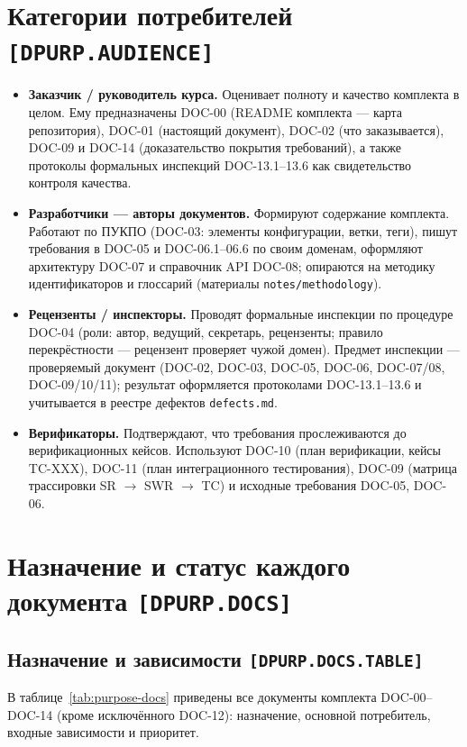 \documentclass[12pt,a4paper]{article}
\begin{document}
\section{Категории потребителей \texttt{[DPURP.AUDIENCE]}}
\begin{itemize}
  \item \textbf{Заказчик / руководитель курса.} Оценивает полноту и качество комплекта
        в целом. Ему предназначены DOC-00 (README комплекта — карта репозитория),
        DOC-01 (настоящий документ), DOC-02 (что заказывается), DOC-09 и DOC-14
        (доказательство покрытия требований), а также протоколы формальных инспекций
        DOC-13.1--13.6 как свидетельство контроля качества.
  \item \textbf{Разработчики — авторы документов.} Формируют содержание комплекта.
        Работают по ПУКПО (DOC-03: элементы конфигурации, ветки, теги), пишут
        требования в DOC-05 и DOC-06.1--06.6 по своим доменам, оформляют архитектуру
        DOC-07 и справочник API DOC-08; опираются на методику идентификаторов и
        глоссарий (материалы \texttt{notes/methodology}).
  \item \textbf{Рецензенты / инспекторы.} Проводят формальные инспекции по процедуре
        DOC-04 (роли: автор, ведущий, секретарь, рецензенты; правило перекрёстности —
        рецензент проверяет чужой домен). Предмет инспекции — проверяемый документ
        (DOC-02, DOC-03, DOC-05, DOC-06, DOC-07/08, DOC-09/10/11); результат
        оформляется протоколами DOC-13.1--13.6 и учитывается в реестре дефектов
        \texttt{defects.md}.
  \item \textbf{Верификаторы.} Подтверждают, что требования прослеживаются до
        верификационных кейсов. Используют DOC-10 (план верификации, кейсы TC-XXX),
        DOC-11 (план интеграционного тестирования), DOC-09 (матрица трассировки
        SR $\rightarrow$ SWR $\rightarrow$ TC) и исходные требования DOC-05, DOC-06.
\end{itemize}

\section{Назначение и статус каждого документа \texttt{[DPURP.DOCS]}}

\subsection{Назначение и зависимости \texttt{[DPURP.DOCS.TABLE]}}
В таблице~\ref{tab:purpose-docs} приведены все документы комплекта DOC-00--DOC-14
(кроме исключённого DOC-12): назначение, основной потребитель, входные зависимости
и приоритет.
\end{document}
